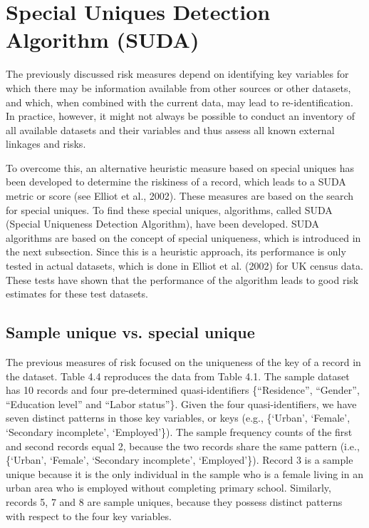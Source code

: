 \documentclass[letterpaper,10pt,english]{sphinxmanual}
\begin{document}
\section{Special Uniques Detection Algorithm (SUDA)}
\label{\detokenize{measure_risk:special-uniques-detection-algorithm-suda}}
The previously discussed risk measures depend on identifying key
variables for which there may be information available from other
sources or other datasets, and which, when combined with the current
data, may lead to re-identification. In practice, however, it might not
always be possible to conduct an inventory of all available datasets and
their variables and thus assess all known external linkages and risks.

To overcome this, an alternative heuristic measure based on special
uniques has been developed to determine the riskiness of a record, which
leads to a SUDA metric or score (see Elliot et al., 2002). These
measures are based on the search for special uniques. To find these
special uniques, algorithms, called SUDA (Special Uniqueness Detection
Algorithm), have been developed. SUDA algorithms are based on the
concept of special uniqueness, which is introduced in the next
subsection. Since this is a heuristic approach, its performance is only
tested in actual datasets, which is done in Elliot et al. (2002) for UK
census data. These tests have shown that the performance of the
algorithm leads to good risk estimates for these test datasets.


\subsection{Sample unique vs. special unique}
\label{\detokenize{measure_risk:sample-unique-vs-special-unique}}
The previous measures of risk focused on the uniqueness of the key of a
record in the dataset. Table 4.4 reproduces the data from Table 4.1. The
sample dataset has 10 records and four pre-determined quasi-identifiers
\{“Residence”, “Gender”, “Education level” and “Labor status”\}. Given the
four quasi-identifiers, we have seven distinct patterns in those key
variables, or keys (e.g., \{‘Urban’, ‘Female’, ‘Secondary incomplete’,
‘Employed’\}). The sample frequency counts of the first and second
records equal 2, because the two records share the same pattern (i.e.,
\{‘Urban’, ‘Female’, ‘Secondary incomplete’, ‘Employed’\}). Record 3 is a
sample unique because it is the only individual in the sample who is a
female living in an urban area who is employed without completing
primary school. Similarly, records 5, 7 and 8 are sample uniques,
because they possess distinct patterns with respect to the four key
variables.
\end{document}
